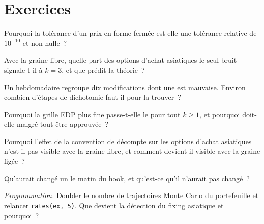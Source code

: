 \section{Exercices}

\begin{exercise}[$\star$]\label{exo:pl:testing-and-continuous-delivery:1}
Pourquoi la tolérance d'un prix en forme fermée est-elle une tolérance relative de $10^{-10}$ et non nulle~?
\end{exercise}

\begin{exercise}[$\star$]\label{exo:pl:testing-and-continuous-delivery:2}
Avec la graine libre, quelle part des options d'achat asiatiques le seul bruit signale-t-il à $k=3$, et que prédit la théorie~?
\end{exercise}

\begin{exercise}[$\star$]\label{exo:pl:testing-and-continuous-delivery:3}
Un  hebdomadaire regroupe dix modifications dont une est mauvaise. Environ combien d'étapes de dichotomie faut-il pour la trouver~?
\end{exercise}

\begin{exercise}[$\star\star$]\label{exo:pl:testing-and-continuous-delivery:4}
Pourquoi la grille EDP plus fine passe-t-elle le  pour tout $k\ge1$, et pourquoi doit-elle malgré tout être approuvée~?
\end{exercise}

\begin{exercise}[$\star\star$]\label{exo:pl:testing-and-continuous-delivery:5}
Pourquoi l'effet de la convention de décompte sur les options d'achat asiatiques n'est-il pas visible avec la graine libre, et comment devient-il visible avec la graine figée~?
\end{exercise}

\begin{exercise}[$\star\star$]\label{exo:pl:testing-and-continuous-delivery:6}
Qu'aurait changé un  le matin du hook, et qu'est-ce qu'il n'aurait pas changé~?
\end{exercise}

\begin{exercise}[$\star\star\star$]\label{exo:pl:testing-and-continuous-delivery:7}
\emph{Programmation.} Doubler le nombre de trajectoires Monte Carlo du portefeuille et relancer \texttt{rates(ex, 5)}. Que devient la détection du fixing asiatique et
pourquoi~?
\end{exercise}

